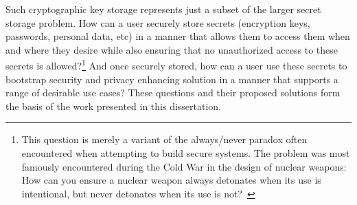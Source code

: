 Such cryptographic key storage represents just a subset of the larger
secret storage problem. How can a user securely store secrets
(encryption keys, passwords, personal data, etc) in a manner that
allows them to access them when and where they desire while also
ensuring that no unauthorized access to these secrets is
allowed?\footnote{This question is merely a variant of the
  always/never paradox often encountered when attempting to build
  secure systems. The problem was most famously encountered during the
  Cold War in the design of nuclear weapons: How can you ensure a
  nuclear weapon always detonates when its use is intentional, but
  never detonates when its use is not?~\cite{schlosser2013}} And once
securely stored, how can a user use these secrets to bootstrap
security and privacy enhancing solution in a manner that supports a
range of desirable use cases?  These questions and their proposed
solutions form the basis of the work presented in this dissertation.

